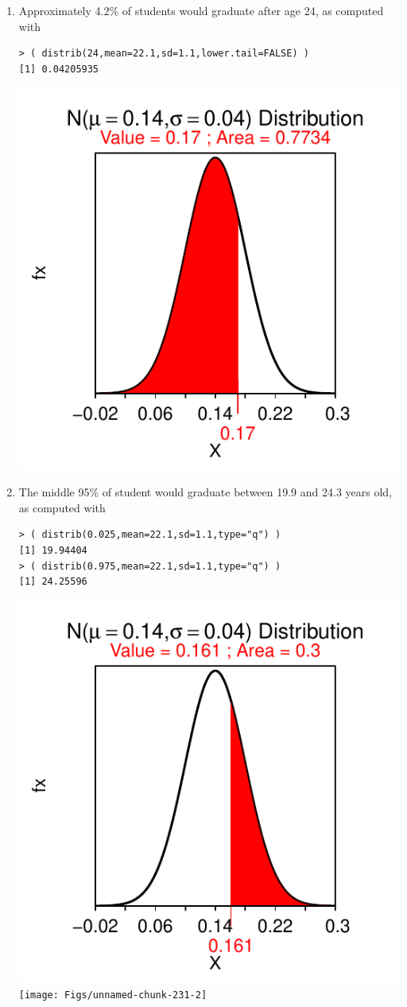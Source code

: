 \documentclass[10pt,openany]{book}\usepackage[]{graphicx}\usepackage[]{color}
\makeatletter
\newenvironment{kframe}{%
 \def\at@end@of@kframe{}%
 \ifinner\ifhmode%
  \def\at@end@of@kframe{\end{minipage}}%
  \begin{minipage}{\columnwidth}%
 \fi\fi%
 \def\FrameCommand##1{\hskip\@totalleftmargin \hskip-\fboxsep
 \colorbox{shadecolor}{##1}\hskip-\fboxsep
     \hskip-\linewidth \hskip-\@totalleftmargin \hskip\columnwidth}%
 \MakeFramed {\advance\hsize-\width
   \@totalleftmargin\z@ \linewidth\hsize
   \@setminipage}}%
 {\par\unskip\endMakeFramed%
 \at@end@of@kframe}
\newenvironment{knitrout}{}{} %
\makeatother
\begin{document}
\begin{itemize}
\begin{enumerate}
\begin{knitrout}
{}



\end{knitrout}
      \item Approximately 4.2\% of students would graduate after age 24, as computed with
\begin{knitrout}
\color{fgcolor}\begin{kframe}
\begin{verbatim}
> ( distrib(24,mean=22.1,sd=1.1,lower.tail=FALSE) )
[1] 0.04205935
\end{verbatim}
\end{kframe}

{\centering \includegraphics[width=.4\linewidth]{Figs/unnamed-chunk-230-1} 

}



\end{knitrout}
      \item The middle 95\% of student would graduate between 19.9 and 24.3 years old, as computed with
\begin{knitrout}
\color{fgcolor}\begin{kframe}
\begin{verbatim}
> ( distrib(0.025,mean=22.1,sd=1.1,type="q") )
[1] 19.94404
> ( distrib(0.975,mean=22.1,sd=1.1,type="q") )
[1] 24.25596
\end{verbatim}
\end{kframe}

{\centering \includegraphics[width=.4\linewidth]{Figs/unnamed-chunk-231-1} 
\texttt{[image: Figs/unnamed-chunk-231-2]} 

}
\end{knitrout}
\end{enumerate}
\end{itemize}
\end{document}
